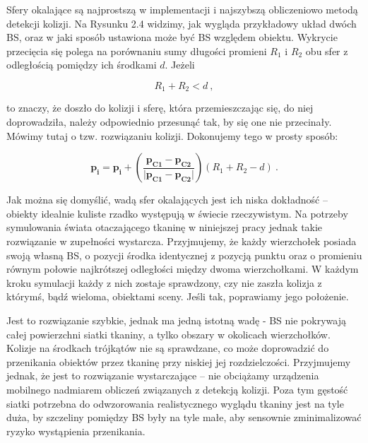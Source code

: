 				
				Sfery okalające są najprostszą w implementacji i najszybszą obliczeniowo metodą detekcji kolizji. Na Rysunku 2.4 widzimy, jak wygląda przykładowy układ dwóch BS, oraz w jaki sposób ustawiona może być BS względem obiektu. Wykrycie przecięcia się polega na porównaniu sumy długości promieni \(R_{1}\) i \(R_{2}\) obu sfer z odległością pomiędzy ich środkami \(d\). Jeżeli
				
				\begin{equation}
				R_{1} + R_{2} < d \ ,
				\end{equation}
				
				to znaczy, że doszło do kolizji i sferę, która przemieszczając się, do niej doprowadziła, należy odpowiednio przesunąć tak, by się one nie przecinały. Mówimy tutaj o tzw. rozwiązaniu kolizji. Dokonujemy tego w prosty sposób:
				
				\begin{equation}
				\mathbf{p_{i}} = \mathbf{p_{i}} + (\frac{\mathbf{p_{C1}} - \mathbf{p_{C2}}}{|\mathbf{p_{C1}} - \mathbf{p_{C2}|}})(R_{1} + R_{2} - d) \ .
				\end{equation}
				
				Jak można się domyślić, wadą sfer okalających jest ich niska dokładność -- obiekty idealnie kuliste rzadko występują w świecie rzeczywistym. Na potrzeby symulowania świata otaczającego tkaninę w niniejszej pracy jednak takie rozwiązanie w zupełności wystarcza. Przyjmujemy, że każdy wierzchołek posiada swoją własną BS, o pozycji środka identycznej z pozycją punktu oraz o promieniu równym połowie najkrótszej odległości między dwoma wierzchołkami. W każdym kroku symulacji każdy z nich zostaje sprawdzony, czy nie zaszła kolizja z którymś, bądź wieloma, obiektami sceny. Jeśli tak, poprawiamy jego położenie. 
				
				Jest to rozwiązanie szybkie, jednak ma jedną istotną wadę - BS nie pokrywają całej powierzchni siatki tkaniny, a tylko obszary w okolicach wierzchołków. Kolizje na środkach trójkątów nie są sprawdzane, co może doprowadzić do przenikania obiektów przez tkaninę przy niskiej jej rozdzielczości. Przyjmujemy jednak, że jest to rozwiązanie wystarczające -- nie obciążamy urządzenia mobilnego nadmiarem obliczeń związanych z detekcją kolizji. Poza tym gęstość siatki potrzebna do odwzorowania realistycznego wyglądu tkaniny jest na tyle duża, by szczeliny pomiędzy BS były na tyle małe, aby sensownie zminimalizować ryzyko wystąpienia przenikania.
				

